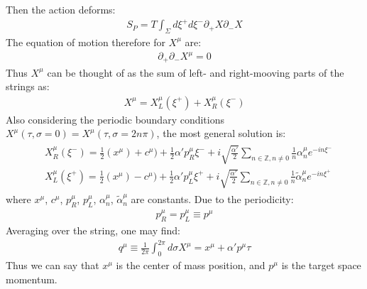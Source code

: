 Then the action deforms:
\begin{align}
    S_{P} = T\int _{\Sigma} d\xi ^{+} d\xi ^{-} \partial _{+} X \partial _{-} X
\end{align}
The equation of motion therefore for $X^{\mu}$ are:
\begin{align}
    \partial _{+} \partial _{-} X^{\mu} = 0
\end{align}
Thus $X^{\mu}$ can be thought of as the sum of left- and right-mooving parts of the strings as:
\begin{align}
    X^{\mu} = X_{L} ^{\mu} (\xi ^{+}) + X_{R} ^{\mu} (\xi ^{-})
\end{align}
Also considering the periodic boundary conditions $X^{\mu} (\tau, \sigma = 0) = X^{\mu} (\tau, \sigma = 2n\pi)$, the most general solution is:
\begin{align}
    \begin{split}
        & X_{R} ^{\mu} (\xi ^{-}) = \frac{1}{2} (x^{\mu}) +c^{\mu}) + \frac{1}{2}\alpha' p_{R} ^{\mu}\xi ^{-} + i\sqrt{\frac{\alpha'}{2}}\sum_{n\in\mathbb{Z}, n\neq 0} \frac{1}{n}\alpha_{n}^{\mu} e^{-in\xi^{-}} \\
        & X_{L} ^{\mu} (\xi ^{+}) = \frac{1}{2} (x^{\mu}) -c^{\mu}) + \frac{1}{2}\alpha' p_{L} ^{\mu}\xi ^{+} + i\sqrt{\frac{\alpha'}{2}}\sum_{n\in\mathbb{Z}, n\neq 0} \frac{1}{n}\tilde{\alpha}_{n}^{\mu} e^{-in\xi^{+}}
    \end{split}
\end{align}
where $x^{\mu}$, $c^{\mu}$, $p_{R}^{\mu}$, $p_{L}^{\mu}$, $\alpha _{n} ^{\mu}$, $\tilde{\alpha} _{n} ^{\mu}$ are constants. Due to the periodicity:
\begin{align}
    p_{R}^{\mu} = p_{L}^\mu \equiv p^{\mu}
\end{align}
Averaging over the string, one may find:
\begin{align}
    q^{\mu} \equiv \frac{1}{2\pi} \int _{0} ^{2\pi} d\sigma X^{\mu} = x^{\mu} + \alpha'p^{\mu} \tau
\end{align}
Thus we can say that $x^{\mu}$ is the center of mass position, and $p^{\mu}$ is the target space momentum. 
